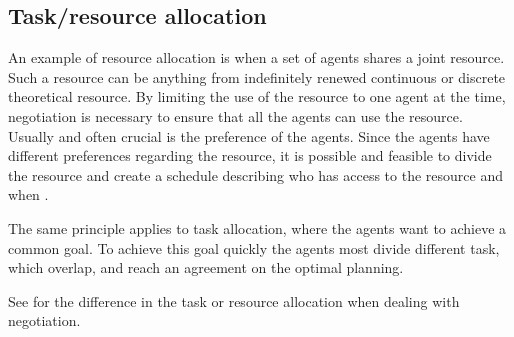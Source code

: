 \subsection{Task/resource allocation}
An example of resource allocation is when a set of agents shares a joint resource. Such a resource can be anything from indefinitely renewed continuous or discrete theoretical resource. By limiting the use of the resource to one agent at the time, negotiation is necessary to ensure that all the agents can use the resource. Usually and often crucial is the preference of the agents. Since the agents have different preferences regarding the resource, it is possible and feasible to divide the resource and create a schedule describing who has access to the resource and when \citep{fatima2014principles}. 

The same principle applies to task allocation, where the agents want to achieve a common goal. To achieve this goal quickly the agents most divide different task, which overlap, and reach an agreement on the optimal planning. 


See  for the difference in the task or resource allocation when dealing with negotiation.

